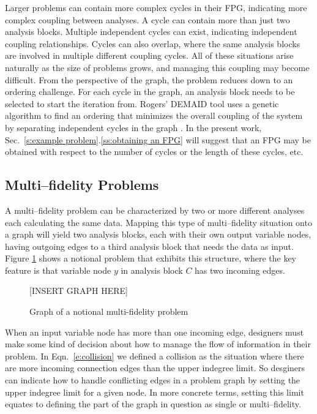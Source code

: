 	Larger problems can contain more complex cycles in their FPG, indicating more 
	complex coupling between analyses. A cycle can contain more than 
	just two analysis blocks. Multiple independent cycles can exist, indicating 
	independent coupling relationships. Cycles can also overlap, where the same analysis 
	blocks are involved in multiple different coupling cycles. All of these situations
	arise naturally as the size of problems grows, and managing this coupling may
	become difficult. From the perspective of the graph, the problem reduces down to 
	an ordering challenge. For each cycle in the graph, an analysis block needs to be selected 
	to start the iteration from. Rogers' DEMAID tool uses a genetic algorithm to find an ordering 
	that minimizes the overall coupling of the system by separating independent 
	cycles in the graph \cite{rogers1996,rogers1996demaid}. In the present work, Sec.~\ref{s:example problem}.\ref{ss:obtaining an FPG} will suggest that an FPG may be obtained with respect to the number of cycles or the length of these cycles, etc.

\subsection{Multi--fidelity Problems}
	\label{ss:multi-fideliy problems}
	A multi--fidelity problem can be characterized by two or more different analyses 
	each calculating the same data. Mapping this type of multi--fidelity situation 
	onto a graph will yield two analysis blocks, each with their own output 
	variable nodes, having outgoing edges to a third analysis block that needs the 
	data as input. Figure \ref{f:collision-example} shows a notional problem 
	that exhibits this structure, where the key feature is that variable node $y$ in 
	analysis block $C$ has two incoming edges. 
	\begin{figure}
	  \begin{center}
	  [INSERT GRAPH HERE]
	  \caption{Graph of a notional multi-fidelity problem \label{f:collision-example}}
	  \end{center}
	\end{figure}

	When an input variable node has more than one incoming edge, designers must make
	some kind of decision about how to manage the flow of information in their problem. 
	In Eqn.~\ref{e:collision} we defined a collision as the situation where
	there are more incoming connection edges than the upper indegree limit. So desginers can
	indicate how to handle conflicting edges in a problem graph by setting the upper indegree limit
	for a given node. In more concrete terms, setting this limit equates to defining 
	the part of the graph in question as single or multi--fidelity. 

